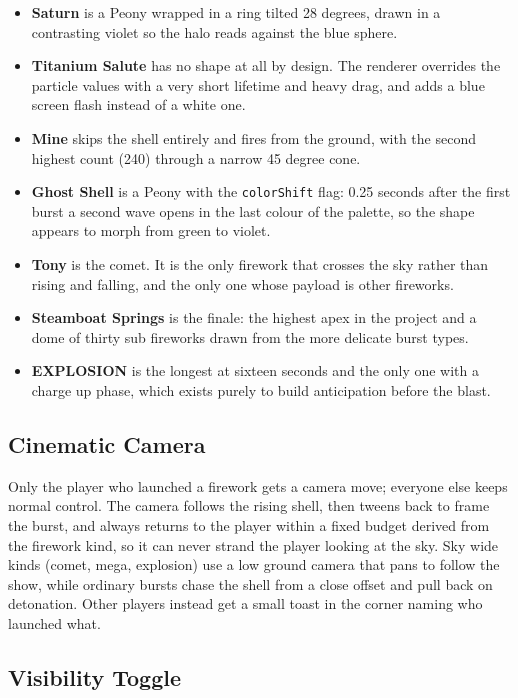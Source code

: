 \documentclass[12pt,letterpaper]{article}
\begin{document}
\begin{itemize}
  \item \textbf{Saturn} is a Peony wrapped in a ring tilted 28 degrees, drawn in a contrasting violet so the halo reads against the blue sphere.
  \item \textbf{Titanium Salute} has no shape at all by design. The renderer overrides the particle values with a very short lifetime and heavy drag, and adds a blue screen flash instead of a white one.
  \item \textbf{Mine} skips the shell entirely and fires from the ground, with the second highest count (240) through a narrow 45 degree cone.
  \item \textbf{Ghost Shell} is a Peony with the \texttt{colorShift} flag: 0.25 seconds after the first burst a second wave opens in the last colour of the palette, so the shape appears to morph from green to violet.
  \item \textbf{Tony} is the comet. It is the only firework that crosses the sky rather than rising and falling, and the only one whose payload is other fireworks.
  \item \textbf{Steamboat Springs} is the finale: the highest apex in the project and a dome of thirty sub fireworks drawn from the more delicate burst types.
  \item \textbf{EXPLOSION} is the longest at sixteen seconds and the only one with a charge up phase, which exists purely to build anticipation before the blast.
\end{itemize}

\subsection{Cinematic Camera}

Only the player who launched a firework gets a camera move; everyone else keeps normal control. The camera follows the rising shell, then tweens back to frame the burst, and always returns to the player within a fixed budget derived from the firework kind, so it can never strand the player looking at the sky. Sky wide kinds (comet, mega, explosion) use a low ground camera that pans to follow the show, while ordinary bursts chase the shell from a close offset and pull back on detonation. Other players instead get a small toast in the corner naming who launched what.

\subsection{Visibility Toggle}
\end{document}
